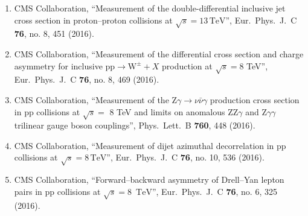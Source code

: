 \begin{itemize}
\begin{enumerate}
\item CMS Collaboration, ``Measurement of the double-differential inclusive jet cross section in proton–proton collisions at $\sqrt{s} = 13\,\text {TeV} $'', Eur.\ Phys.\ J.\ C {\bf 76}, no. 8, 451 (2016).

\item CMS Collaboration, ``Measurement of the differential cross section and charge asymmetry for inclusive $\mathrm {p}\mathrm {p}\rightarrow \mathrm {W}^{\pm }+X$ production at ${\sqrt{s}} = 8$ TeV'', Eur.\ Phys.\ J.\ C {\bf 76}, no. 8, 469 (2016).

\item CMS Collaboration, ``Measurement of the $ \mathrm{ Z } \gamma \rightarrow \nu \bar{\nu} \gamma$ production cross section in pp collisions at $\sqrt{s}=$ 8 TeV and limits on anomalous $ \mathrm{ ZZ } \gamma$ and $ \mathrm{Z} \gamma \gamma$ trilinear gauge boson couplings'', Phys.\ Lett.\ B {\bf 760}, 448 (2016).

\item CMS Collaboration, ``Measurement of dijet azimuthal decorrelation in pp collisions at $\sqrt{s}=8\,\mathrm{TeV} $'', Eur.\ Phys.\ J.\ C {\bf 76}, no. 10, 536 (2016).

\item CMS Collaboration, ``Forward–backward asymmetry of Drell–Yan lepton pairs in pp collisions at $\sqrt{s} = 8$ $\,\mathrm{TeV}$'', Eur.\ Phys.\ J.\ C {\bf 76}, no. 6, 325 (2016).


\end{enumerate}
\end{itemize}
